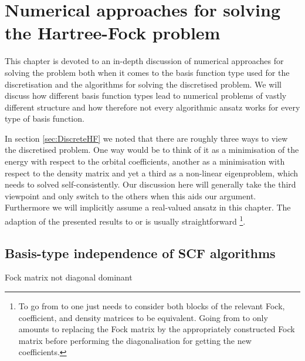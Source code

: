 \chapter{Numerical approaches for solving the Hartree-Fock problem}
\label{ch:NumSolveHF}
\newcommand{\kexp}{\ensuremath k_\text{exp}}

This chapter is devoted to an in-depth discussion of
numerical approaches for solving the \HF problem
both when it comes to the basis function type used for the discretisation
and the algorithms for solving the discretised problem.
We will discuss how different basis function types
lead to numerical problems of vastly different structure
and how therefore not every algorithmic ansatz works
for every type of basis function.

In section \ref{sec:DiscreteHF} we noted that there are
roughly three ways to view the discretised \HF problem.
One way would be to think of it as a minimisation of the energy
with respect to the orbital coefficients,
another as a minimisation with respect to the density matrix
and yet a third as a non-linear eigenproblem,
which needs to solved self-consistently.
Our discussion here will generally take the third viewpoint
and only switch to the others when this aids our argument.
Furthermore we will implicitly assume a real-valued
\UHF ansatz in this chapter.
The adaption of the presented results to
\RHF or \ROHF is usually straightforward%
\footnote{
To go from \UHF to \RHF one just needs to consider both blocks of the relevant
Fock, coefficient, and density matrices to be equivalent.
Going from \UHF to \ROHF only amounts to replacing the \UHF Fock matrix
by the appropriately constructed \ROHF Fock matrix before performing
the diagonalisation for getting the new coefficients.
}.






\section{Basis-type independence of SCF algorithms}

Fock matrix not diagonal dominant

